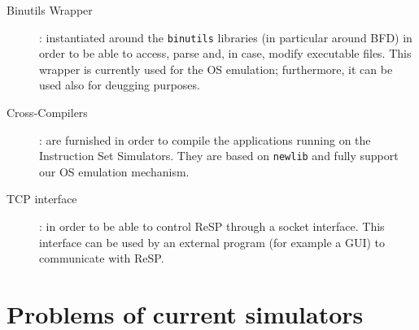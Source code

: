 \begin{description}
  \item[Binutils Wrapper]: instantiated around the \texttt{binutils} libraries (in particular around BFD) in order to be able to access, parse and, in case, modify executable files. This wrapper is currently used for the OS emulation; furthermore, it can be used also for deugging purposes.
  \item[Cross-Compilers]: are furnished in order to compile the applications running on the Instruction Set Simulators. They are based on \texttt{newlib} and fully support our OS emulation mechanism.
  \item[TCP interface]: in order to be able to control ReSP through a socket interface. This interface can be used by an external program (for example a GUI) to communicate with ReSP.
\end{description}

\section{Problems of current simulators}
\label{intro:problems}
